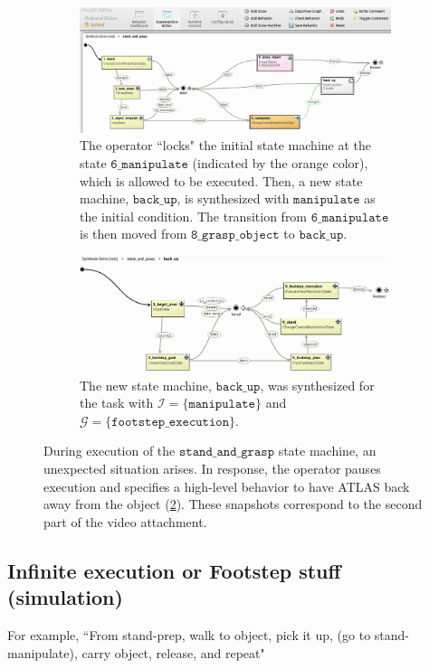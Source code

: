 \begin{figure}[t]
	\centering
	\begin{subfigure}[b]{0.99\columnwidth}
	\includegraphics[width=0.99\columnwidth, clip]{./img/synthesis_runtime_connect_sm.png}
	\caption{The operator ``locks" the initial state machine at the state $\mathtt{6\_manipulate}$ (indicated by the orange color), which is allowed to be executed.
	Then, a new state machine, $\mathtt{back\_up}$, is synthesized with $\mathtt{manipulate}$ as the initial condition.
	The transition from $\mathtt{6\_manipulate}$ is then moved from $\mathtt{8\_grasp\_object}$ to $\mathtt{back\_up}$.
	} 
	\label{Fig:runtime1}
	\end{subfigure}
	
	\vspace{4 pt}
	\begin{subfigure}[b]{0.99\columnwidth}
	\includegraphics[width=0.99\columnwidth, clip]{./img/synthesis_runtime_synthesized_sm.png}
	\caption{The new state machine, $\mathtt{back\_up}$, was synthesized for the task with $\mathcal{I} = \{ \mathtt{manipulate} \}$ and $\mathcal{G} = \{ \mathtt{footstep\_execution} \}$.
	} 
	\label{Fig:runtime2}
	\end{subfigure}
	\caption{During execution of the $\mathtt{stand\_and\_grasp}$ state machine, an unexpected situation arises.
	In response, the operator pauses execution and specifies a high-level behavior to have ATLAS back away from the object (\ref{Fig:runtime2}).
	These snapshots correspond to the second part of the video attachment.
	}
	\label{Fig:synthesis_runtime_demo}
\end{figure}

\subsection{Infinite execution or Footstep stuff (simulation)}

For example, ``From stand-prep, walk to object, pick it up, (go to stand-manipulate), carry object, release, and repeat"


